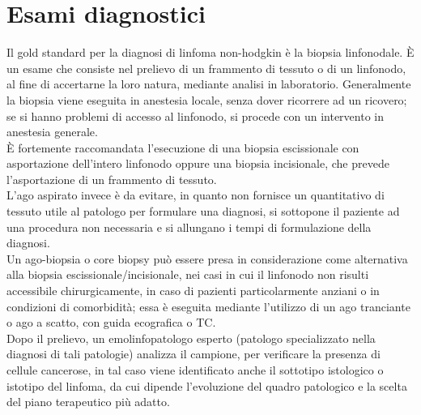 \section{Esami diagnostici}
Il gold standard per la diagnosi di linfoma non-hodgkin è la biopsia linfonodale. 
È un esame che consiste nel prelievo di un frammento di tessuto o di un linfonodo, al fine di 
accertarne la loro natura, mediante analisi in laboratorio. 
Generalmente la biopsia viene eseguita in anestesia locale, senza dover ricorrere ad un ricovero; 
se si hanno problemi di accesso al linfonodo, si procede con un intervento in anestesia generale\cite{ISS}.\\
È fortemente raccomandata l’esecuzione di una biopsia escissionale con asportazione dell’intero linfonodo 
oppure una biopsia incisionale, che prevede l’asportazione di un frammento di tessuto\cite{AMERICANCANCER}.\\ 
L’ago aspirato invece è da evitare, in quanto non fornisce un quantitativo di tessuto utile al patologo per formulare 
una diagnosi, si sottopone il paziente ad una procedura non necessaria e si allungano i tempi di formulazione 
della diagnosi\cite{reteveneta}.\\
Un ago-biopsia o core biopsy può essere presa in considerazione come alternativa alla biopsia escissionale/incisionale,
nei casi in cui il linfonodo non risulti accessibile chirurgicamente, in caso di pazienti particolarmente anziani o in 
condizioni di comorbidità; essa è eseguita mediante l’utilizzo di un ago tranciante o ago a scatto, con guida 
ecografica o TC\cite{reteveneta}.\\
Dopo il prelievo, un emolinfopatologo esperto (patologo specializzato nella diagnosi di tali patologie) analizza 
il campione, per verificare la presenza di cellule cancerose, in tal caso viene identificato anche il sottotipo 
istologico o istotipo del linfoma, da cui dipende l’evoluzione del quadro patologico e la scelta del piano 
terapeutico più adatto\cite{LLS}.\\


